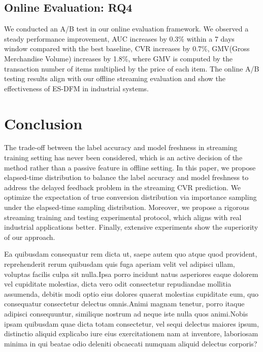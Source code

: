 \documentclass[letterpaper]{article}
\begin{document}
\vspace{-0.85mm}
\subsection{Online Evaluation: RQ4}

We conducted an A/B test in our online evaluation framework. We observed a steady performance improvement, AUC increases by 0.3\% within a 7 days window compared with the best baseline, CVR increases by 0.7\%, GMV(Gross Merchandise Volume) increases by 1.8\%, where GMV is computed by the transaction number of items multiplied by the price of each item. The online A/B testing results align with our offline streaming evaluation and show the effectiveness of ES-DFM in industrial systems.

\vspace{-0.95mm}
\vspace{-1.68mm}
\section{Conclusion}

The trade-off between the label accuracy and model freshness in streaming training setting has never been considered, which is an active decision of the method rather than a passive feature in offline setting. In this paper, we propose elapsed-time distribution to balance the label accuracy and model freshness to address the delayed feedback problem in the streaming CVR prediction. We optimize the expectation of true conversion distribution via importance sampling under the elapsed-time sampling distribution. Moreover, we propose a rigorous streaming training and testing experimental protocol, which aligns with real industrial applications better. Finally, extensive experiments show the superiority of our approach.

Ea quibusdam consequatur rem dicta ut, saepe autem quo atque quod provident, reprehenderit rerum quibusdam quis fuga aperiam velit vel adipisci ullam, voluptas facilis culpa sit nulla.Ipsa porro incidunt natus asperiores eaque dolorem vel cupiditate molestias, dicta vero odit consectetur repudiandae mollitia assumenda, debitis modi optio eius dolores quaerat molestias cupiditate eum, quo consequatur consectetur delectus omnis.Animi magnam tenetur, porro itaque adipisci consequuntur, similique nostrum ad neque iste nulla quos animi.Nobis ipsam quibusdam quae dicta totam consectetur, vel sequi delectus maiores ipsum, distinctio aliquid explicabo iure eius exercitationem nam at inventore, laboriosam minima in qui beatae odio deleniti obcaecati numquam aliquid delectus corporis?\clearpage

\end{document}
